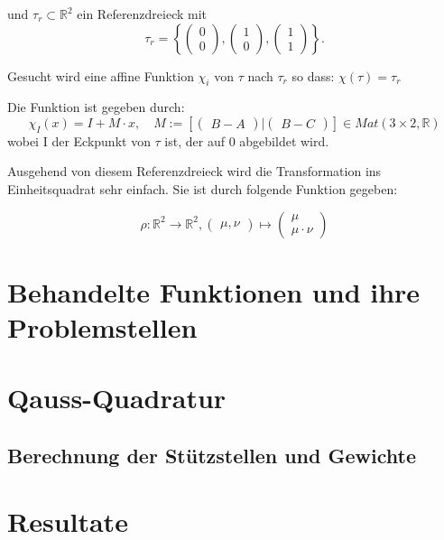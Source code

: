 \documentclass[12pt]{article}
\begin{document}
und $\tau_r \subset \mathbb{R}^2$ ein Referenzdreieck mit
\[
 \tau_r = \left \{
\begin{pmatrix} 0\\ 0 \end{pmatrix}
,
\begin{pmatrix} 1\\ 0\end{pmatrix}
,
\begin{pmatrix} 1\\ 1\end{pmatrix}
\right \} .
\]

Gesucht wird eine affine Funktion $\chi_i$ von $\tau$ nach $\tau_r$ so dass: $\chi(\tau) = \tau_r$

Die Funktion ist gegeben durch:
\[
\chi_I(x) = I + M\cdot x, \quad M := \left[
\begin{pmatrix} B-A \end{pmatrix}
|
\begin{pmatrix} B-C \end{pmatrix}
\right]
 \in Mat(3\times 2,\mathbb{R})
\]
wobei I der Eckpunkt von $\tau$ ist, der auf 0 abgebildet wird.

Ausgehend von diesem Referenzdreieck wird die Transformation ins Einheitsquadrat sehr einfach. Sie ist durch folgende Funktion gegeben:

\[
	\rho : \mathbb{R}^2 \rightarrow \mathbb{R}^2, \begin{pmatrix} \mu,\nu \end{pmatrix} \mapsto \begin{pmatrix} \mu\\\mu\cdot\nu \end{pmatrix}
\]

\newpage

\section{Behandelte Funktionen und ihre Problemstellen}

\newpage

\section{Qauss-Quadratur}
\subsection{Berechnung der Stützstellen und Gewichte}

\newpage

\section{Resultate}

\newpage
\end{document}
